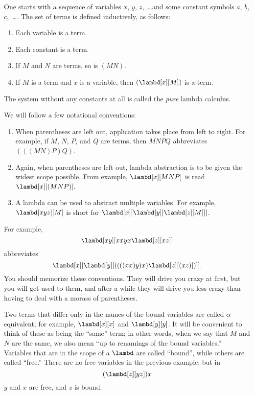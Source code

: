 \documentclass[../../../include/open-logic-section]{subfiles}
\begin{document}

One starts with a sequence of variables $x$, $y$, $z$,~\dots and some
constant symbols $a$, $b$, $c$,~\dots. The set of terms is defined
inductively, as follows:
\begin{enumerate}
\item Each variable is a term.
\item Each constant is a term.
\item If $M$ and $N$ are terms, so is $(MN)$.
\item If $M$ is a term and $x$ is a variable, then $(\lambd[x][M])$ is a
  term.
\end{enumerate}
The system without any constants at all is called the \emph{pure}
lambda calculus.

We will follow a few notational conventions:
\begin{enumerate}
\item When parentheses are left out, application takes place from left
  to right. For example, if $M$, $N$, $P$, and $Q$ are terms, then
  $MNPQ$ abbreviates $(((MN)P)Q)$.
\item Again, when parentheses are left out, lambda abstraction is to
  be given the widest scope possible. From example, $\lambd[x][MNP]$ is
  read $\lambd[x][(MNP)]$.
\item A lambda can be used to abstract multiple variables. For
  example, $\lambd[xyz][M]$ is short for
  $\lambd[x][\lambd[y][\lambd[z][M]]]$.
\end{enumerate}

For example,
\[
\lambd[xy][xxyx \lambd[z][xz]]
\]
abbreviates
\[
\lambd[x][\lambd[y][((((xx)y)x) \lambd[z][(xz)])]].
\]
You should memorize these conventions. They will drive you crazy at
first, but you will get used to them, and after a while they will
drive you less crazy than having to deal with a morass of parentheses.

Two terms that differ only in the names of the bound variables are
called $\alpha$-equivalent; for example, $\lambd[x][x]$ and
$\lambd[y][y]$. It will be convenient to think of these as being the
``same'' term; in other words, when we say that $M$ and $N$ are the
same, we also mean ``up to renamings of the bound variables.''
Variables that are in the scope of a $\lambd$ are called ``bound'',
while others are called ``free.'' There are no free variables in the
previous example; but in
\[
(\lambd[z][yz])x
\]
$y$ and $x$ are free, and $z$ is bound.
\end{document}
